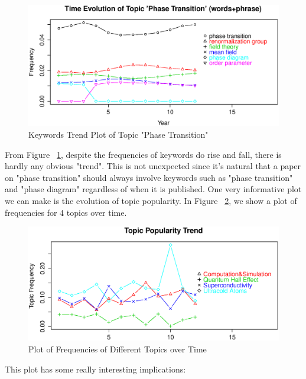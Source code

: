 \documentclass[DIV=calc, paper=letter, fontsize=10pt, twocolumn]{scrartcl}	 %
\begin{document}
\begin{figure}[!ht]
  \includegraphics[scale = 0.365]{PhaseTrans(w_p).eps}
  \caption{Keywords Trend Plot of Topic "Phase Transition"}
  \label{fig: PhaseTrans_wp}
\end{figure}
From Figure ~\ref{fig: PhaseTrans_wp}, despite the frequencies of keywords do rise and fall, there is hardly any obvious "trend". This is not unexpected since it's natural that a paper on "phase transition" should always involve keywords such as "phase transition" and "phase diagram" regardless of when it is published.\newpage \noindent
One very informative plot we can make is the evolution of topic popularity. In Figure ~\ref{fig: TopPop_p}, we show a plot of frequencies for 4 topics over time.\par
\begin{figure}[h!]
  \includegraphics[scale = 0.365]{TopPop_p.eps}
  \caption{Plot of Frequencies of Different Topics over Time}
  \label{fig: TopPop_p}
\end{figure}
This plot has some really interesting implications: 
\end{document}

